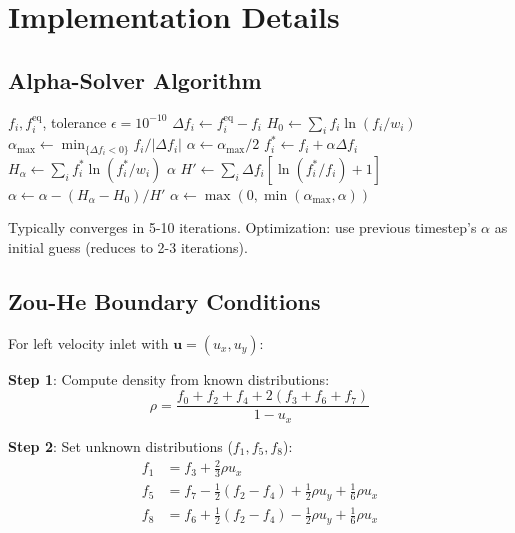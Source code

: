 \chapter{Implementation Details}

\section{Alpha-Solver Algorithm}

\begin{algorithm}[H]
\caption{Newton-Raphson $\alpha$-Solver}
\begin{algorithmic}[1]
\Require $f_i, f_i^{\mathrm{eq}}$, tolerance $\epsilon = 10^{-10}$
\State $\Delta f_i \gets f_i^{\mathrm{eq}} - f_i$
\State $H_0 \gets \sum_i f_i \ln(f_i/w_i)$
\State
\State {}
\State $\alpha_{\max} \gets \min_{\{\Delta f_i < 0\}} f_i/|\Delta f_i|$
\State $\alpha \gets \alpha_{\max}/2$ 
\State
{}
    \State $f_i^* \gets f_i + \alpha\Delta f_i$
    \State $H_\alpha \gets \sum_i f_i^* \ln(f_i^*/w_i)$
        \State \Return $\alpha$
    \EndIf
    \State $H' \gets \sum_i \Delta f_i [\ln(f_i^*/f_i) + 1]$
    \State $\alpha \gets \alpha - (H_\alpha - H_0)/H'$
    \State $\alpha \gets \max(0, \min(\alpha_{\max}, \alpha))$ 
\EndFor
\end{algorithmic}
\end{algorithm}

Typically converges in 5-10 iterations. Optimization: use previous timestep's $\alpha$ as initial guess (reduces to 2-3 iterations).

\section{Zou-He Boundary Conditions}

For left velocity inlet with $\mathbf{u} = (u_x, u_y)$:

\textbf{Step 1}: Compute density from known distributions:
\begin{equation}
\rho = \frac{f_0 + f_2 + f_4 + 2(f_3 + f_6 + f_7)}{1 - u_x}
\end{equation}

\textbf{Step 2}: Set unknown distributions ($f_1, f_5, f_8$):
\begin{align}
f_1 &= f_3 + \frac{2}{3}\rho u_x \\
f_5 &= f_7 - \frac{1}{2}(f_2 - f_4) + \frac{1}{2}\rho u_y + \frac{1}{6}\rho u_x \\
f_8 &= f_6 + \frac{1}{2}(f_2 - f_4) - \frac{1}{2}\rho u_y + \frac{1}{6}\rho u_x
\end{align}

